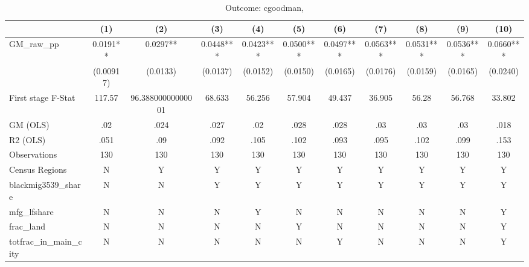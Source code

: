 \begin{table}[htbp]\centering
\def\sym#1{\ifmmode^{#1}\else\(^{#1}\)\fi}
\caption{Outcome: cgoodman, }
\begin{tabular}{l*{10}{c}}
\toprule
            &\multicolumn{1}{c}{(1)}   &\multicolumn{1}{c}{(2)}   &\multicolumn{1}{c}{(3)}   &\multicolumn{1}{c}{(4)}   &\multicolumn{1}{c}{(5)}   &\multicolumn{1}{c}{(6)}   &\multicolumn{1}{c}{(7)}   &\multicolumn{1}{c}{(8)}   &\multicolumn{1}{c}{(9)}   &\multicolumn{1}{c}{(10)}   \\
\midrule
GM\_raw\_pp   &    0.0191** &    0.0297** &    0.0448***&    0.0423***&    0.0500***&    0.0497***&    0.0563***&    0.0531***&    0.0536***&    0.0660***\\
            & (0.00917)   &  (0.0133)   &  (0.0137)   &  (0.0152)   &  (0.0150)   &  (0.0165)   &  (0.0176)   &  (0.0159)   &  (0.0165)   &  (0.0240)   \\
\midrule
First stage F-Stat&    117.57   &96.38800000000001   &    68.633   &    56.256   &    57.904   &    49.437   &    36.905   &     56.28   &    56.768   &    33.802   \\
GM (OLS)    &       .02   &      .024   &      .027   &       .02   &      .028   &      .028   &       .03   &       .03   &       .03   &      .018   \\
R2 (OLS)    &      .051   &       .09   &      .092   &      .105   &      .102   &      .093   &      .095   &      .102   &      .099   &      .153   \\
Observations&       130   &       130   &       130   &       130   &       130   &       130   &       130   &       130   &       130   &       130   \\
Census Regions&         N   &         Y   &         Y   &         Y   &         Y   &         Y   &         Y   &         Y   &         Y   &         Y   \\
blackmig3539\_share&         N   &         N   &         Y   &         Y   &         Y   &         Y   &         Y   &         Y   &         Y   &         Y   \\
mfg\_lfshare &         N   &         N   &         N   &         Y   &         N   &         N   &         N   &         N   &         N   &         Y   \\
frac\_land   &         N   &         N   &         N   &         N   &         Y   &         N   &         N   &         N   &         N   &         Y   \\
totfrac\_in\_main\_city&         N   &         N   &         N   &         N   &         N   &         Y   &         N   &         N   &         N   &         Y   \\

\end{tabular}
\end{table}
